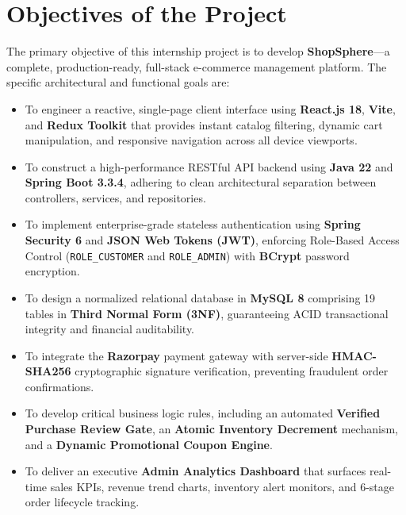 \section{Objectives of the Project}
The primary objective of this internship project is to develop \textbf{ShopSphere}—a complete, production-ready, full-stack e-commerce management platform. The specific architectural and functional goals are:
\begin{itemize}[leftmargin=2.0em]
    \item To engineer a reactive, single-page client interface using \textbf{React.js 18}, \textbf{Vite}, and \textbf{Redux Toolkit} that provides instant catalog filtering, dynamic cart manipulation, and responsive navigation across all device viewports.
    \item To construct a high-performance RESTful API backend using \textbf{Java 22} and \textbf{Spring Boot 3.3.4}, adhering to clean architectural separation between controllers, services, and repositories.
    \item To implement enterprise-grade stateless authentication using \textbf{Spring Security 6} and \textbf{JSON Web Tokens (JWT)}, enforcing Role-Based Access Control (\texttt{ROLE\_CUSTOMER} and \texttt{ROLE\_ADMIN}) with \textbf{BCrypt} password encryption.
    \item To design a normalized relational database in \textbf{MySQL 8} comprising 19 tables in \textbf{Third Normal Form (3NF)}, guaranteeing ACID transactional integrity and financial auditability.
    \item To integrate the \textbf{Razorpay} payment gateway with server-side \textbf{HMAC-SHA256} cryptographic signature verification, preventing fraudulent order confirmations.
    \item To develop critical business logic rules, including an automated \textbf{Verified Purchase Review Gate}, an \textbf{Atomic Inventory Decrement} mechanism, and a \textbf{Dynamic Promotional Coupon Engine}.
    \item To deliver an executive \textbf{Admin Analytics Dashboard} that surfaces real-time sales KPIs, revenue trend charts, inventory alert monitors, and 6-stage order lifecycle tracking.
\end{itemize}

